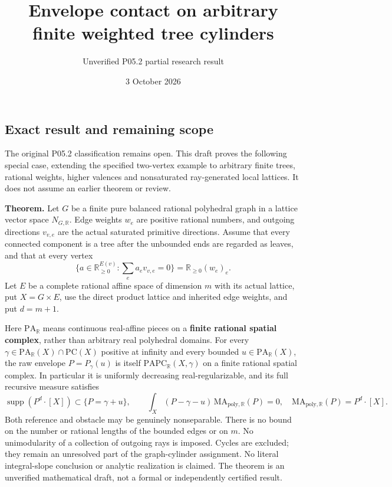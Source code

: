 \documentclass[
  11pt,
]{article}
\title{Envelope contact on arbitrary finite weighted tree cylinders}
\author{Unverified P05.2 partial research result}
\date{3 October 2026}
\begin{document}
\maketitle

\subsection{Exact result and remaining
scope}\label{exact-result-and-remaining-scope}

The original P05.2 classification remains open. This draft proves the
following special case, extending the specified two-vertex example to
arbitrary finite trees, rational weights, higher valences and
nonsaturated ray-generated local lattices. It does not assume an earlier
theorem or review.

\textbf{Theorem.} Let \(G\) be a finite pure balanced rational
polyhedral graph in a lattice vector space \(N_{G,\mathbb R}\). Edge
weights \(w_e\) are positive rational numbers, and outgoing directions
\(v_{v,e}\) are the actual saturated primitive directions. Assume that
every connected component is a tree after the unbounded ends are
regarded as leaves, and that at every vertex \[
\{a\in\mathbb R_{\geq0}^{E(v)}:\sum_ea_ev_{v,e}=0\}
=\mathbb R_{\geq0}(w_e)_e. \tag{1}
\] Let \(E\) be a complete rational affine space of dimension \(m\) with
its actual lattice, put \(X=G\times E\), use the direct product lattice
and inherited edge weights, and put \(d=m+1\).

Here \(\mathrm{PA}_{\mathbb R}\) means continuous real-affine pieces on
a \textbf{finite rational spatial complex}, rather than arbitrary real
polyhedral domains. For every
\(\gamma\in\mathrm{PA}_{\mathbb R}(X)\cap\mathrm{PC}(X)\) positive at
infinity and every bounded \(u\in\mathrm{PA}_{\mathbb R}(X)\), the raw
envelope \(P=P_\gamma(u)\) is itself
\(\mathrm{PAPC}_{\mathbb R}(X,\gamma)\) on a finite rational spatial
complex. In particular it is uniformly decreasing real-regularizable,
and its full recursive measure satisfies \[
\operatorname{supp}(P^d\cdot[X])\subset\{P=\gamma+u\},\qquad
\int_X(P-\gamma-u)\,\mathrm{MA}_{\mathrm{poly},\mathbb R}(P)=0,
\quad \mathrm{MA}_{\mathrm{poly},\mathbb R}(P)=P^d\cdot[X]. \tag{2}
\] Both reference and obstacle may be genuinely nonseparable. There is
no bound on the number or rational lengths of the bounded edges or on
\(m\). No unimodularity of a collection of outgoing rays is imposed.
Cycles are excluded; they remain an unresolved part of the
graph-cylinder assignment. No literal integral-slope conclusion or
analytic realization is claimed. The theorem is an unverified
mathematical draft, not a formal or independently certified result.
\end{document}
